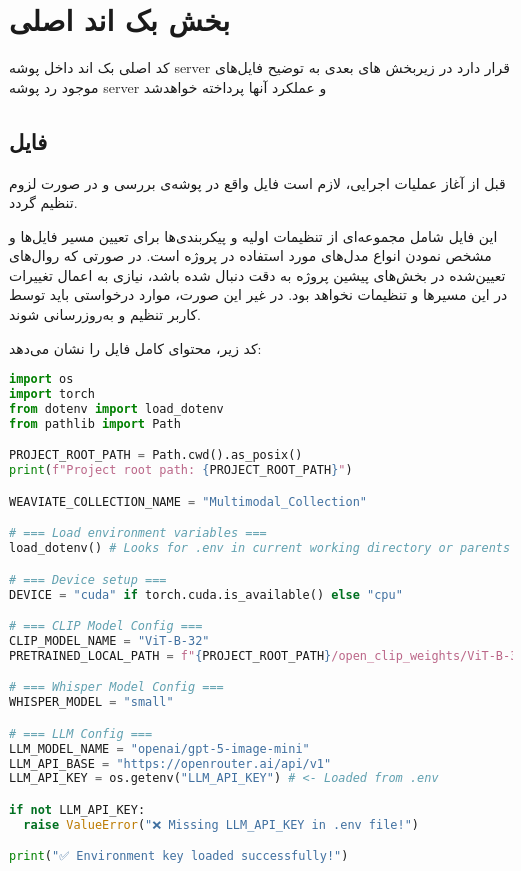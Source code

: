 \documentclass{article}
\begin{document}
\section{بخش بک اند اصلی}
کد اصلی بک اند داخل پوشه server قرار دارد
در زیربخش های بعدی به توضیح فایل‌های موجود رد پوشه server و عملکرد آنها پرداخته خواهدشد

\subsection{فایل }

قبل از آغاز عملیات اجرایی، لازم است فایل  واقع در پوشه‌ی  بررسی و در صورت لزوم تنظیم گردد.

این فایل شامل مجموعه‌ای از تنظیمات اولیه و پیکربندی‌ها برای تعیین مسیر فایل‌ها و مشخص نمودن انواع مدل‌های مورد استفاده در پروژه است. در صورتی که روال‌های تعیین‌شده در بخش‌های پیشین پروژه به دقت دنبال شده باشد، نیازی به اعمال تغییرات در این مسیرها و تنظیمات نخواهد بود. در غیر این صورت، موارد درخواستی باید توسط کاربر تنظیم و به‌روزرسانی شوند.

کد زیر، محتوای کامل فایل  را نشان می‌دهد:

\begin{latin}
\begin{lstlisting}[language=Python]
import os
import torch
from dotenv import load_dotenv
from pathlib import Path

PROJECT_ROOT_PATH = Path.cwd().as_posix()
print(f"Project root path: {PROJECT_ROOT_PATH}")

WEAVIATE_COLLECTION_NAME = "Multimodal_Collection"

# === Load environment variables ===
load_dotenv() # Looks for .env in current working directory or parents

# === Device setup ===
DEVICE = "cuda" if torch.cuda.is_available() else "cpu"

# === CLIP Model Config ===
CLIP_MODEL_NAME = "ViT-B-32"
PRETRAINED_LOCAL_PATH = f"{PROJECT_ROOT_PATH}/open_clip_weights/ViT-B-32-openai/open_clip_model.safetensors"

# === Whisper Model Config ===
WHISPER_MODEL = "small"

# === LLM Config ===
LLM_MODEL_NAME = "openai/gpt-5-image-mini"
LLM_API_BASE = "https://openrouter.ai/api/v1"
LLM_API_KEY = os.getenv("LLM_API_KEY") # <- Loaded from .env

if not LLM_API_KEY:
  raise ValueError("❌ Missing LLM_API_KEY in .env file!")

print("✅ Environment key loaded successfully!")
\end{lstlisting}
\end{latin}
\end{document}
